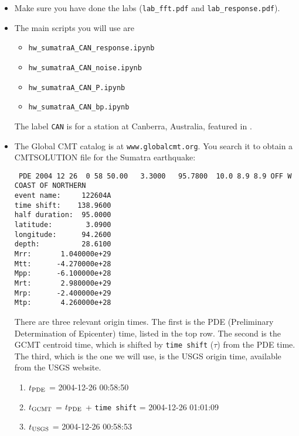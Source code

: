\documentclass[11pt,titlepage,fleqn]{article}
\newcommand{\tfileresponse}{{\tt hw\_sumatraA\_CAN\_response.ipynb}}
\newcommand{\tfilenoise}{{\tt hw\_sumatraA\_CAN\_noise.ipynb}}
\newcommand{\tfileP}{{\tt hw\_sumatraA\_CAN\_P.ipynb}}
\newcommand{\tfilebp}{{\tt hw\_sumatraA\_CAN\_bp.ipynb}}
\begin{document}
\begin{itemize}

\item Make sure you have done the labs (\verb+lab_fft.pdf+ and \verb+lab_response.pdf+).

\item The main scripts you will use are
%
\begin{itemize}
\item \tfileresponse\
\item \tfilenoise\
\item \tfileP\
\item \tfilebp\
\end{itemize}
%
The label \verb+CAN+ is for a station at Canberra, Australia, featured in \citet[][Figure~1]{Park2005}.


\item The Global CMT catalog is at \verb+www.globalcmt.org+. You search it to obtain a CMTSOLUTION file for the Sumatra earthquake:
%
\begin{verbatim}
 PDE 2004 12 26  0 58 50.00   3.3000   95.7800  10.0 8.9 8.9 OFF W COAST OF NORTHERN                 
event name:     122604A        
time shift:    138.9600
half duration:  95.0000
latitude:        3.0900
longitude:      94.2600
depth:          28.6100
Mrr:       1.040000e+29
Mtt:      -4.270000e+28
Mpp:      -6.100000e+28
Mrt:       2.980000e+29
Mrp:      -2.400000e+29
Mtp:       4.260000e+28
\end{verbatim}
%
There are three relevant origin times. The first is the PDE (Preliminary Determination of Epicenter) time, listed in the top row. The second is the GCMT centroid time, which is shifted by \verb+time shift+ ($\tau$) from the PDE time. The third, which is the one we will use, is the USGS origin time, available from the USGS website.
%
\begin{enumerate}
\item $t_{\rm PDE}$ = 2004-12-26 00:58:50
\item $t_{\rm GCMT}$ = $t_{\rm PDE}$ + \verb+time shift+ = 2004-12-26 01:01:09
\item $t_{\rm USGS}$ = 2004-12-26 00:58:53
\end{enumerate}



\end{itemize}
\end{document}
